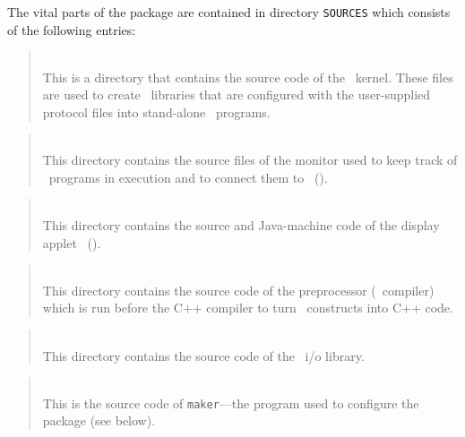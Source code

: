 The vital parts of the package are contained in directory {\tt SOURCES}
which consists of the following entries:

\medskip

\begin{quote}
\noindent{}\\ \hspace{0in}
This is a directory that contains the source code of the \smurph\ kernel.
These files are used to create \smurph\ libraries that are configured with
the user-supplied protocol files into stand-alone \smurph\ programs.
\end{quote}

\begin{quote}
\noindent{}\\ \hspace{0in}
This directory contains the source files of the monitor used to keep track
of \smurph\ programs in execution
and to connect them to \dsd\ ().
\end{quote}

\begin{quote}
\noindent{}\\ \hspace{0in}
This directory contains the source and Java-machine
code of the display applet \dsd\ ().
\end{quote}

\begin{quote}
\noindent{}\\ \hspace{0in}
This directory contains the source code of the preprocessor 
(\smurph\ compiler) which is run before the C++ compiler
to turn \smurph\ constructs into C++ code.
\end{quote}

\begin{quote}
\noindent{}\\ \hspace{0in}
This directory contains the source code of the \smurph\ 
i/o library.
\end{quote}

\begin{quote}
\noindent{}\\ \hspace{0in}
This is the source code of {\tt maker}---the
program used to configure the package (see below).
\end{quote}

